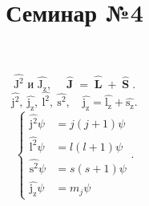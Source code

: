 \documentclass[a4paper]{article}
\title{Семинар №4}
\begin{document}
	\maketitle
\[
\widehat{\operatorname{J^2}} \text{ и } \widehat{\operatorname{J_z}},\quad
\widehat{\operatorname{\mathbf{J}}}=\widehat{\operatorname{\mathbf{L}}}+\widehat{\operatorname{\mathbf{S}}}
.\] 
\[
\widehat{\operatorname{j^2}},\ \widehat{\operatorname{j_z}},\
\widehat{\operatorname{l^2}},\ \widehat{\operatorname{s^2}},\quad
\widehat{\operatorname{j_z}}=\widehat{\operatorname{l_z}}+\widehat{\operatorname{s_z}}
.\] 
\[
\left\{
\begin{aligned}
	\widehat{\operatorname{j^2}}\psi&= j(j+1)\psi\\
	\widehat{\operatorname{l^2}}\psi&= l(l+1)\psi\\
	\widehat{\operatorname{s^2}}\psi&= s(s+1)\psi \\
	\widehat{\operatorname{j_z}}\psi&= m_j \psi
\end{aligned}
\right.
.\] 
\end{document}

